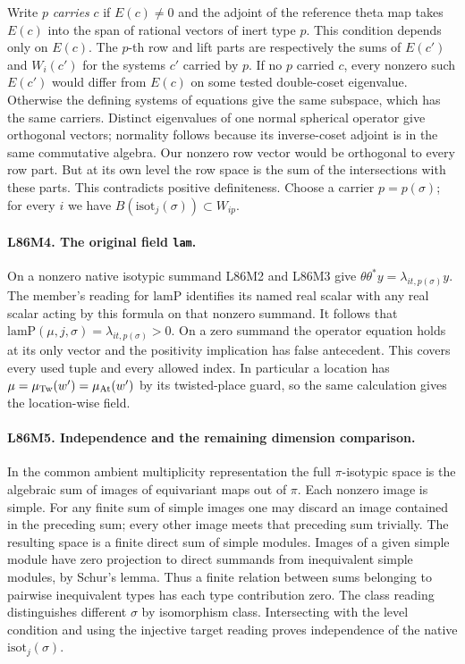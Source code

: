 Write $p$ \emph{carries} $c$ if $E(c)\ne0$ and the adjoint of the
reference theta map takes $E(c)$ into the span of rational vectors of
inert type $p$. This condition depends only on $E(c)$. The $p$-th
row and lift parts are respectively the sums of $E(c')$ and
$W_i(c')$ for the systems $c'$ carried by $p$. If no $p$ carried
$c$, every nonzero such $E(c')$ would differ from $E(c)$ on some
tested double-coset eigenvalue. Otherwise the defining systems
of equations give the same subspace, which has the same carriers.
Distinct eigenvalues of one normal spherical operator give orthogonal
vectors; normality follows because its inverse-coset adjoint is in
the same commutative algebra. Our nonzero row vector would be
orthogonal to every row part. But at its own level the row space is
the sum of the intersections with these parts. This contradicts
positive definiteness. Choose a carrier $p=p(\sigma)$; for every
$i$ we have $B(\mathrm{isot}_j(\sigma))\subset W_{ip}$.

\paragraph{L86M4. The original field \textnormal{\texttt{lam}}.}
On a nonzero native isotypic summand L86M2 and L86M3 give
$\theta\theta^*y=\lambda_{it,p(\sigma)} y$. The member's reading
for $\mathrm{lamP}$ identifies its named real scalar with any real
scalar acting by this formula on that nonzero summand. It follows
that $\mathrm{lamP}(\mu,j,\sigma)=\lambda_{it,p(\sigma)}>0$.
On a zero summand the operator equation holds at its only vector
and the positivity implication has false antecedent. This covers
every used tuple and every allowed index. In particular a location
has $\mu=\mu_{\rm Tw}(w')=\mu_{\rm At}(w')$ by its twisted-place
guard, so the same calculation gives the location-wise field.

\paragraph{L86M5. Independence and the remaining dimension comparison.}
In the common ambient multiplicity representation the full
$\pi$-isotypic space is the algebraic sum of images of equivariant
maps out of $\pi$. Each nonzero image is simple. For any finite sum
of simple images one may discard an image contained in the preceding
sum; every other image meets that preceding sum trivially. The
resulting space is a finite direct sum of simple modules. Images of
a given simple module have zero projection to direct summands from
inequivalent simple modules, by Schur's lemma. Thus a finite
relation between sums belonging to pairwise inequivalent types has
each type contribution zero. The class reading distinguishes
different $\sigma$ by isomorphism class. Intersecting with the
level condition and using the injective target reading proves
independence of the native $\mathrm{isot}_j(\sigma)$.


